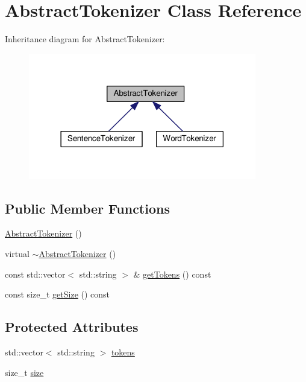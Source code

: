 \hypertarget{classAbstractTokenizer}{}\section{Abstract\+Tokenizer Class Reference}
\label{classAbstractTokenizer}


Inheritance diagram for Abstract\+Tokenizer\+:\nopagebreak
\begin{figure}[H]
\begin{center}
\leavevmode
\includegraphics[width=282pt]{classAbstractTokenizer__inherit__graph}
\end{center}
\end{figure}
\subsection*{Public Member Functions}
\begin{DoxyCompactItemize}
\item 
\hyperlink{classAbstractTokenizer_ad5dd529f11552a1bb522f97077148270}{Abstract\+Tokenizer} ()
\item 
virtual \hyperlink{classAbstractTokenizer_ac9005dbf8971809768ddfeea2db3e3a9}{$\sim$\+Abstract\+Tokenizer} ()
\item 
const std\+::vector$<$ std\+::string $>$ \& \hyperlink{classAbstractTokenizer_a1c23c57444bf8356347f1ae113034d1b}{get\+Tokens} () const
\item 
const size\+\_\+t \hyperlink{classAbstractTokenizer_ab1f0ec877a204abe9338f290e515e7d7}{get\+Size} () const
\end{DoxyCompactItemize}
\subsection*{Protected Attributes}
\begin{DoxyCompactItemize}
\item 
std\+::vector$<$ std\+::string $>$ \hyperlink{classAbstractTokenizer_a76c3d1105c591f92f1036c327acd36f3}{tokens}
\item 
size\+\_\+t \hyperlink{classAbstractTokenizer_a25d4d9be114e714ac362dd64991e0f65}{size}
\end{DoxyCompactItemize}
